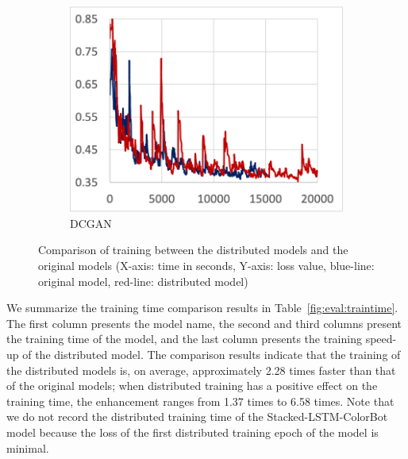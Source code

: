 \begin{figure}[!ht]
  \begin{subfigure}[t]{.22\textwidth}
    \includegraphics[width=\textwidth]{tf2-13}
    \caption{\small DCGAN}
  \end{subfigure} 

  \caption{Comparison of training between the distributed models and the
  original models (X-axis: time in seconds, Y-axis: loss value, blue-line:
  original model, red-line: distributed model)}
  \label{fig:eval:train}
\end{figure}

We summarize the training time comparison results in
Table~\ref{fig:eval:traintime}.
The first column presents the model name, the second and third columns
present the training time of the model, and the last column presents the
training speed-up of the distributed model.
The comparison results indicate that the training of the distributed
models is, on average, approximately 2.28 times faster than that of the
original models; when distributed training has a positive effect on the
training time, the enhancement ranges from 1.37 times to 6.58 times.
Note that we do not record the distributed training time of the
Stacked-LSTM-ColorBot model because the loss of the first distributed training
epoch of the model is minimal.


